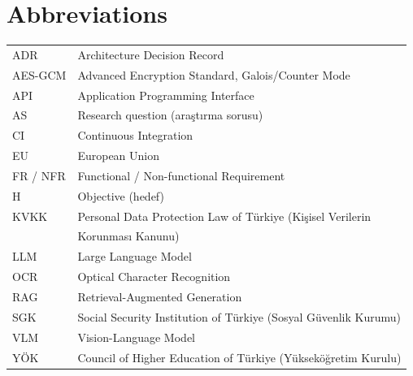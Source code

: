 \chapter*{Abbreviations}
\begin{tabular}{@{}ll@{}}
  ADR  & Architecture Decision Record \\
  AES-GCM & Advanced Encryption Standard, Galois/Counter Mode \\
  API  & Application Programming Interface \\
  AS   & Research question (araştırma sorusu) \\
  CI   & Continuous Integration \\
  EU   & European Union \\
  FR / NFR & Functional / Non-functional Requirement \\
  H    & Objective (hedef) \\
  KVKK & Personal Data Protection Law of Türkiye (Kişisel Verilerin\\ & Korunması Kanunu) \\
  LLM  & Large Language Model \\
  OCR  & Optical Character Recognition \\
  RAG  & Retrieval-Augmented Generation \\
  SGK  & Social Security Institution of Türkiye (Sosyal Güvenlik Kurumu) \\
  VLM  & Vision-Language Model \\
  YÖK  & Council of Higher Education of Türkiye (Yükseköğretim Kurulu) \\
\end{tabular}
